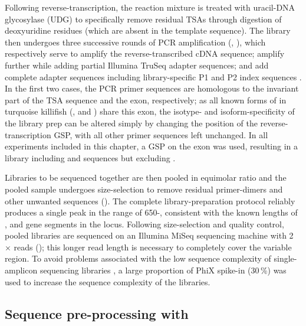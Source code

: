 Following reverse-transcription, the reaction mixture is treated with uracil-DNA glycosylase (UDG) to specifically remove residual TSAs through digestion of deoxyuridine residues (which are absent in the template sequence). The library then undergoes three successive rounds of PCR amplification (, ), which respectively serve to amplify the reverse-transcribed cDNA sequence; amplify further while adding partial Illumina TruSeq adapter sequences; and add complete adapter sequences including library-specific P1 and P2 index sequences \parencite{vollmers2013consensus}. In the first two cases, the PCR primer sequences are homologous to the invariant part of the TSA sequence and the  exon, respectively; as all known forms of \igh{} in turquoise killifish (,  and ) share this exon, the isotype- and isoform-specificity of the library prep can be altered simply by changing the position of the reverse-transcription GSP, with all other primer sequences left unchanged. In all experiments included in this chapter, a GSP on the  exon was used, resulting in a library including  and  sequences but excluding .

Libraries to be sequenced together are then pooled in equimolar ratio and the pooled sample undergoes size-selection to remove residual primer-dimers and other unwanted sequences (). The complete library-preparation protocol reliably produces a single peak in the range of 650-, consistent with the known lengths of \vh, \dh and \jh gene segments in the \Nfu locus. Following size-selection and quality control, pooled libraries are sequenced on an Illumina MiSeq sequencing machine with 2 ×  reads (); this longer read length is necessary to completely cover the variable region. To avoid problems associated with the low sequence complexity of single-amplicon sequencing libraries \parencite{illumina2017diversity}, a large proportion of PhiX spike-in (30\,\%) was used to increase the sequence complexity of the libraries.

\subsection{Sequence pre-processing with }
\label{sec:igseq_protocol_preprocess}

